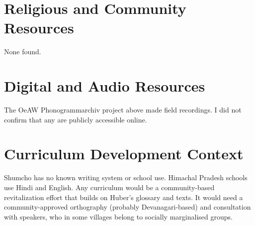 \documentclass[12pt]{article}
\begin{document}
\section{Religious and Community Resources}
None found.

\section{Digital and Audio Resources}
The OeAW Phonogrammarchiv project above made field recordings. I did not confirm that any are publicly accessible online.

\section{Curriculum Development Context}
Shumcho has no known writing system or school use. Himachal Pradesh schools use Hindi and English. Any curriculum would be a community-based revitalization effort that builds on Huber's glossary and texts. It would need a community-approved orthography (probably Devanagari-based) and consultation with speakers, who in some villages belong to socially marginalised groups.
\end{document}
